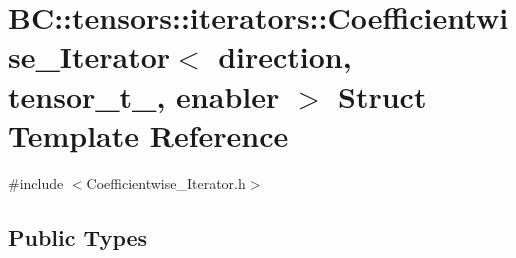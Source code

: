 \hypertarget{structBC_1_1tensors_1_1iterators_1_1Coefficientwise__Iterator}{}\section{BC\+:\+:tensors\+:\+:iterators\+:\+:Coefficientwise\+\_\+\+Iterator$<$ direction, tensor\+\_\+t\+\_\+, enabler $>$ Struct Template Reference}
\label{structBC_1_1tensors_1_1iterators_1_1Coefficientwise__Iterator}


{\ttfamily \#include $<$Coefficientwise\+\_\+\+Iterator.\+h$>$}

\subsection*{Public Types}
